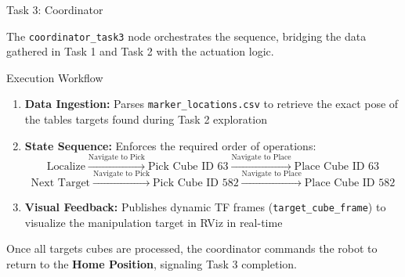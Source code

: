 \begin{frame}{Task 3: Coordinator}

    The \texttt{coordinator\_task3} node orchestrates the sequence, bridging the data gathered in Task 1 and Task 2 with the actuation logic.

    \vspace{0.1cm}

    \begin{block}{Execution Workflow}
        \begin{enumerate}
            \item \textbf{Data Ingestion:} Parses \texttt{marker\_locations.csv} to retrieve the exact pose of the tables targets found during Task 2 exploration
            \item \textbf{State Sequence:} Enforces the required order of operations:
            {
                \small
                $$ \text{Localize} \xrightarrow{\text{Navigate to Pick}} \text{Pick Cube ID 63} \xrightarrow{\text{Navigate to Place}} \text{Place Cube ID 63} $$
                $$ \text{Next Target} \xrightarrow{\text{Navigate to Pick}} \text{Pick Cube ID 582} \xrightarrow{\text{Navigate to Place}} \text{Place Cube ID 582} $$
            }
            \item \textbf{Visual Feedback:} Publishes dynamic TF frames (\texttt{target\_cube\_frame}) to visualize the manipulation target in RViz in real-time
        \end{enumerate}
    \end{block}

    \vspace{0.2cm}

    Once all targets cubes are processed, the coordinator commands the robot to return to the \textbf{Home Position}, signaling Task 3 completion.

\end{frame}


